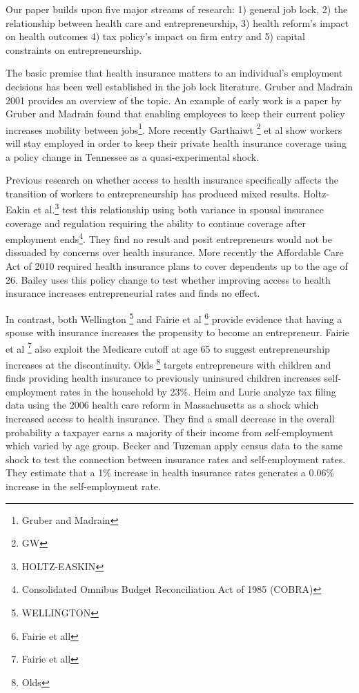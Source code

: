 \documentclass[12pt]{article}
\begin{document}
Our paper builds upon five major streams of research: 1) general job lock, 2) the relationship between health care and entrepreneurship, 3) health reform's impact on health outcomes 4) tax policy's impact on firm entry and 5) capital constraints on entrepreneurship. 

The basic premise that health insurance matters to an individual's employment decisions has been well established in the job lock literature. Gruber and Madrain 2001 provides an overview of the topic. An example of early work is a paper by Gruber and Madrain found that enabling employees to keep their current policy increases mobility between jobs\footnote{Gruber and Madrain}. More recently Garthaiwt \footnote{GW} et al show workers will stay employed in order to keep their private health insurance coverage using a policy change in Tennessee as a quasi-experimental shock. 

Previous research on whether access to health insurance specifically affects the transition of workers to entrepreneurship has produced mixed results. Holtz-Eakin et al.\footnote{HOLTZ-EASKIN} test this relationship using both variance in spousal insurance coverage and regulation requiring the ability to continue coverage after employment ends\footnote{Consolidated Omnibus Budget Reconciliation Act of 1985 (COBRA)}. They find no result and posit entrepreneurs would not be dissuaded by concerns over health insurance. More recently the Affordable Care Act of 2010 required health insurance plans to cover dependents up to the age of 26. Bailey uses this policy change to test whether improving access to health insurance increases entrepreneurial rates and finds no effect. 

In contrast, both Wellington \footnote{WELLINGTON} and Fairie et al \footnote{Fairie et all} provide evidence that having a spouse with insurance increases the propensity to become an entrepreneur. Fairie et al \footnote{Fairie et all} also exploit the Medicare cutoff at age 65 to suggest entrepreneurship increases at the discontinuity. Olds \footnote{Olds} targets entrepreneurs with children and finds providing health insurance to previously uninsured children increases self-employment rates in the household by 23\%. Heim and Lurie analyze tax filing data using the 2006 health care reform in Massachusetts as a shock which increased access to health insurance. They find a small decrease in the overall probability a taxpayer earns a majority of their income from self-employment which varied by age group. Becker and Tuzeman apply census data to the same shock to test the connection between insurance rates and self-employment rates. They estimate that a 1\% increase in health insurance rates generates a 0.06\% increase in the self-employment rate. 
\end{document}
